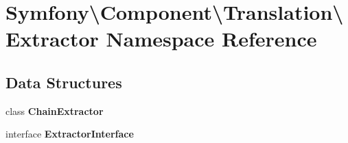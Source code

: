 \section{Symfony\textbackslash{}Component\textbackslash{}Translation\textbackslash{}Extractor Namespace Reference}
\label{namespace_symfony_1_1_component_1_1_translation_1_1_extractor}
\subsection*{Data Structures}
\begin{DoxyCompactItemize}
\item 
class {\bf Chain\+Extractor}
\item 
interface {\bf Extractor\+Interface}
\end{DoxyCompactItemize}
